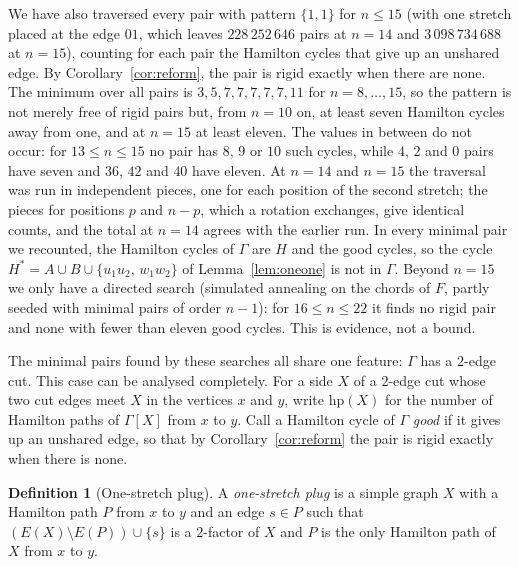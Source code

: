 \documentclass[11pt,a4paper]{article}
\theoremstyle{definition}
\newtheorem{definition}[theorem]{Definition}
\theoremstyle{remark}
\begin{document}
We have also traversed every pair with pattern $\{1,1\}$ for $n\le15$ (with one stretch placed at the edge $01$, which leaves $228\,252\,646$ pairs at $n=14$ and $3\,098\,734\,688$ at $n=15$), counting for each pair the Hamilton cycles that give up an unshared edge. By Corollary~\ref{cor:reform}, the pair is rigid exactly when there are none. The minimum over all pairs is $3,5,7,7,7,7,7,11$ for $n=8,\dots,15$, so the pattern is not merely free of rigid pairs but, from $n=10$ on, at least seven Hamilton cycles away from one, and at $n=15$ at least eleven. The values in between do not occur: for $13\le n\le15$ no pair has $8$, $9$ or $10$ such cycles, while $4$, $2$ and $0$ pairs have seven and $36$, $42$ and $40$ have eleven. At $n=14$ and $n=15$ the traversal was run in independent pieces, one for each position of the second stretch; the pieces for positions $p$ and $n-p$, which a rotation exchanges, give identical counts, and the total at $n=14$ agrees with the earlier run. In every minimal pair we recounted, the Hamilton cycles of $\Gamma$ are $H$ and the good cycles, so the cycle $H^*=A\cup B\cup\{u_1u_2,\,w_1w_2\}$ of Lemma~\ref{lem:oneone} is not in $\Gamma$. Beyond $n=15$ we only have a directed search (simulated annealing on the chords of $F$, partly seeded with minimal pairs of order $n-1$): for $16\le n\le22$ it finds no rigid pair and none with fewer than eleven good cycles. This is evidence, not a bound.

The minimal pairs found by these searches all share one feature: $\Gamma$ has a $2$-edge cut. This case can be analysed completely. For a side $X$ of a $2$-edge cut whose two cut edges meet $X$ in the vertices $x$ and $y$, write $\mathrm{hp}(X)$ for the number of Hamilton paths of $\Gamma[X]$ from $x$ to $y$. Call a Hamilton cycle of $\Gamma$ \emph{good} if it gives up an unshared edge, so that by Corollary~\ref{cor:reform} the pair is rigid exactly when there is none.

\begin{definition}[One-stretch plug]\label{def:plug1}
A \emph{one-stretch plug} is a simple graph $X$ with a Hamilton path $P$ from $x$ to $y$ and an edge $s\in P$ such that $(E(X)\setminus E(P))\cup\{s\}$ is a $2$-factor of $X$ and $P$ is the only Hamilton path of $X$ from $x$ to $y$.
\end{definition}
\end{document}
